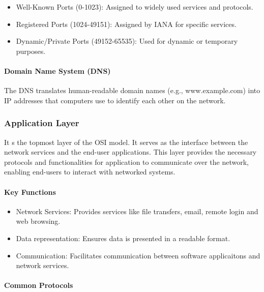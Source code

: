 \documentclass[a4paper]{article}
\begin{document}
    \begin{itemize}
        \item Well-Known Ports (0-1023): Assigned to widely used services and protocols.
        \item Registered Ports (1024-49151): Assigned by IANA for specific services. 
        \item Dynamic/Private Ports (49152-65535): Used for dynamic or temporary purposes.
    \end{itemize}

    \paragraph{Domain Name System (DNS)} The DNS translates human-readable domain names (e.g., www.example.com) into IP addresses that computers use to identify each other on the network.




    \subsubsection{Application Layer} It s the topmost layer of the OSI model. It serves as the interface between the network services and the end-user applications. This layer provides the necessary protocols and functionalities for application to communicate over the network, enabling end-users to interact with networked systems.

    \paragraph{Key Functions}

    \begin{itemize}
        \item Network Services: Provides services like file transfers, email, remote login and web browsing.
        \item Data representation: Ensures data is presented in a readable format.
        \item Communication: Facilitates communication between software applicaitons and network services.
    \end{itemize}

    \paragraph{Common Protocols}
\end{document}
